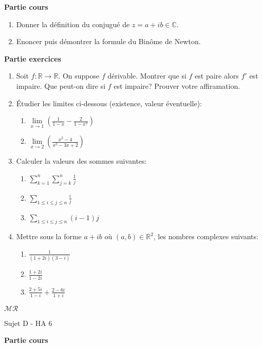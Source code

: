 \documentclass[a4paper,11pt, landscape]{article}
\begin{document}
\begin{multicols*}{4}
\begin{flushleft}
  \textbf{Partie cours} 
\end{flushleft} 
\begin{enumerate}[leftmargin=*]
  \item Donner la définition du conjugué de $z = a + ib \in \mathbb{C}$.
  \item Enoncer puis démontrer la formule du Binôme de Newton.
\end{enumerate}
\textbf{Partie exercices}
\begin{enumerate}[leftmargin=*]
  \item Soit $f : \mathbb{R} \rightarrow \mathbb{R}$. On suppose $f$ dérivable. Montrer que si $f$ est paire alors $f'$ est impaire. Que peut-on dire si $f$ est impaire? Prouver votre affiramation.
  \item Étudier les limites ci-dessous (existence, valeur éventuelle):
  \begin{enumerate}
    \item $\lim\limits_{x \rightarrow 1}\left(\frac{1}{1-x} - \frac{2}{1-x^2}\right)$
    \item $\lim\limits_{x \rightarrow 2}\left(\frac{x^2 - 4}{x^2 - 3x+2}\right)$
  \end{enumerate}
  \item Calculer la valeurs des sommes suivantes:
  \begin{enumerate}
    \item $\sum\limits_{k=1}^n\sum\limits_{j=k}^n\frac{1}{j}$
    \item $\sum\limits_{1\leq i \leq j \leq n}\frac{i}{j}$
    \item $\sum\limits_{1\leq i \leq j \leq n}(i-1)j$
  \end{enumerate}
\item Mettre sous la forme $a + ib$ où $(a,b) \in \mathbb{R}^2$, les nombres complexes suivants:
\begin{enumerate}
  \item $\frac{1}{(1+2i)(3-i)}$
  \item $\frac{1+2i}{1-2i}$
  \item $\frac{2+5i}{1-i} + \frac{2-6i}{1+i}$
\end{enumerate}
\end{enumerate}
\centerline{$\mathcal{MR}$}
\vfill\null
\columnbreak

\centerline{Sujet D - HA 6}
\begin{flushleft}
  \textbf{Partie cours} 
\end{flushleft} 


\end{multicols*}
\end{document}
